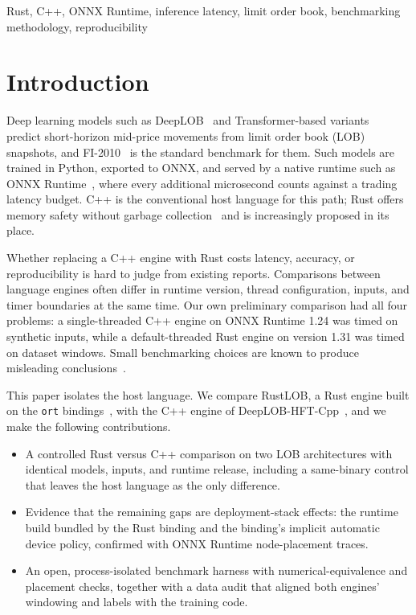 \documentclass[conference]{IEEEtran}
\begin{document}
\begin{IEEEkeywords}
Rust, C++, ONNX Runtime, inference latency, limit order book, benchmarking methodology, reproducibility
\end{IEEEkeywords}

\section{Introduction}

Deep learning models such as DeepLOB~\cite{zhang2019deeplob} and Transformer-based variants~\cite{wallbridge2020translob} predict short-horizon mid-price movements from limit order book (LOB) snapshots, and FI-2010~\cite{ntakaris2018fi2010} is the standard benchmark for them. Such models are trained in Python, exported to ONNX, and served by a native runtime such as ONNX Runtime~\cite{onnxruntime}, where every additional microsecond counts against a trading latency budget. C++ is the conventional host language for this path; Rust offers memory safety without garbage collection~\cite{matsakis2014rust,jung2018rustbelt} and is increasingly proposed in its place.

Whether replacing a C++ engine with Rust costs latency, accuracy, or reproducibility is hard to judge from existing reports. Comparisons between language engines often differ in runtime version, thread configuration, inputs, and timer boundaries at the same time. Our own preliminary comparison had all four problems: a single-threaded C++ engine on ONNX Runtime 1.24 was timed on synthetic inputs, while a default-threaded Rust engine on version 1.31 was timed on dataset windows. Small benchmarking choices are known to produce misleading conclusions~\cite{mytkowicz2009wrong,georges2007rigorous,hoefler2015scientific}.

This paper isolates the host language. We compare RustLOB, a Rust engine built on the \texttt{ort} bindings~\cite{ort}, with the C++ engine of DeepLOB-HFT-Cpp~\cite{prashant2026deeplobhft}, and we make the following contributions.
\begin{itemize}
\item A controlled Rust versus C++ comparison on two LOB architectures with identical models, inputs, and runtime release, including a same-binary control that leaves the host language as the only difference.
\item Evidence that the remaining gaps are deployment-stack effects: the runtime build bundled by the Rust binding and the binding's implicit automatic device policy, confirmed with ONNX Runtime node-placement traces.
\item An open, process-isolated benchmark harness with numerical-equivalence and placement checks, together with a data audit that aligned both engines' windowing and labels with the training code.
\end{itemize}
\end{document}
